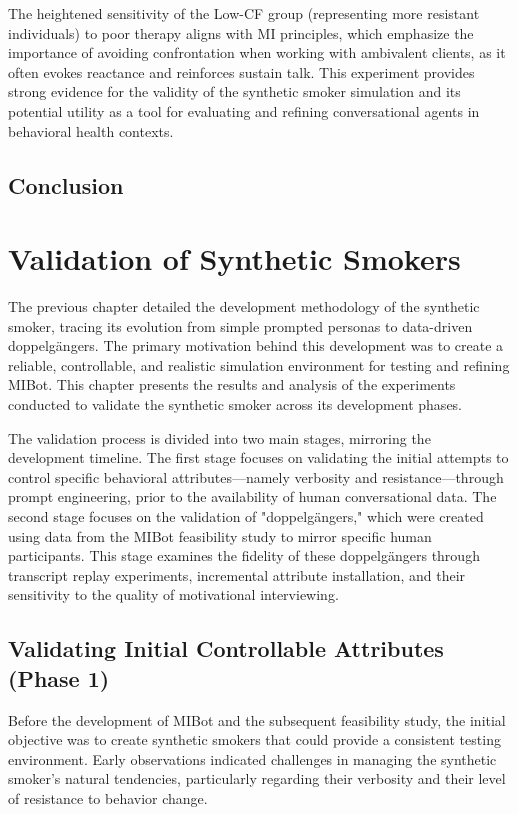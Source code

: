 The heightened sensitivity of the Low-CF group (representing more resistant individuals) to poor therapy aligns with MI principles, which emphasize the importance of avoiding confrontation when working with ambivalent clients, as it often evokes reactance and reinforces sustain talk. This experiment provides strong evidence for the validity of the synthetic smoker simulation and its potential utility as a tool for evaluating and refining conversational agents in behavioral health contexts.

\section{Conclusion}

\chapter{Validation of Synthetic Smokers}
\label{ch:validation-of-synthetic-smokers}

The previous chapter detailed the development methodology of the synthetic smoker, tracing its evolution from simple prompted personas to data-driven doppelgängers. The primary motivation behind this development was to create a reliable, controllable, and realistic simulation environment for testing and refining MIBot. This chapter presents the results and analysis of the experiments conducted to validate the synthetic smoker across its development phases.

The validation process is divided into two main stages, mirroring the development timeline. The first stage focuses on validating the initial attempts to control specific behavioral attributes—namely verbosity and resistance—through prompt engineering, prior to the availability of human conversational data. The second stage focuses on the validation of "doppelgängers," which were created using data from the MIBot feasibility study to mirror specific human participants. This stage examines the fidelity of these doppelgängers through transcript replay experiments, incremental attribute installation, and their sensitivity to the quality of motivational interviewing.

\section{Validating Initial Controllable Attributes (Phase 1)}

Before the development of MIBot and the subsequent feasibility study, the initial objective was to create synthetic smokers that could provide a consistent testing environment. Early observations indicated challenges in managing the synthetic smoker's natural tendencies, particularly regarding their verbosity and their level of resistance to behavior change.

